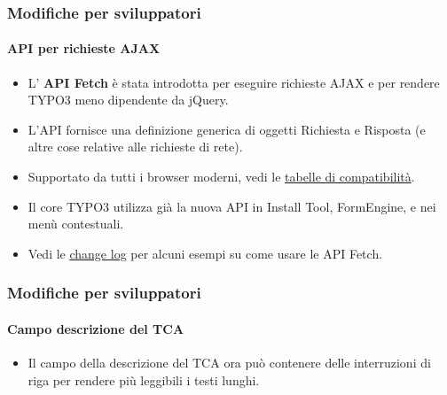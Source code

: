 
\begin{frame}[fragile]
	\frametitle{Modifiche per sviluppatori}
	\framesubtitle{API per richieste AJAX}

	\lstset{basicstyle=\tiny\ttfamily}

	\begin{itemize}
		\item L' \textbf{API Fetch} è stata introdotta per eseguire richieste AJAX e
		    per rendere TYPO3 meno dipendente da jQuery.
		\item L'API fornisce una definizione generica di oggetti Richiesta e Risposta
			(e altre cose relative alle richieste di rete).
		\item Supportato da tutti i browser moderni, vedi le
			\href{https://developer.mozilla.org/en-US/docs/Web/API/Fetch_API}{tabelle di compatibilità}.
		\item Il core TYPO3 utilizza già la nuova API in Install Tool, FormEngine, e
			nei menù contestuali.
		\item Vedi le
			\href{https://docs.typo3.org/c/typo3/cms-core/master/en-us/Changelog/10.3/Feature-89738-ApiForAjaxRequests.html}{change log}
			per alcuni esempi su come usare le API Fetch.

	\end{itemize}

\end{frame}


\begin{frame}[fragile]
	\frametitle{Modifiche per sviluppatori}
	\framesubtitle{Campo descrizione del TCA}

	\begin{itemize}
		\item Il campo della descrizione del TCA ora può contenere delle interruzioni di riga
		    per rendere più leggibili i testi lunghi.
	\end{itemize}

\end{frame}


